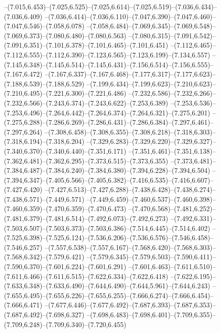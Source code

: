   --(7.015,6.453)--(7.025,6.525)--(7.025,6.614)--(7.025,6.519)--(7.036,6.434)--(7.036,6.409)%
  --(7.036,6.414)--(7.036,6.110)--(7.047,6.390)--(7.047,6.460)--(7.047,6.546)--(7.058,6.078)%
  --(7.058,6.484)--(7.069,6.345)--(7.069,6.548)--(7.069,6.373)--(7.080,6.480)--(7.080,6.563)%
  --(7.080,6.315)--(7.091,6.542)--(7.091,6.351)--(7.101,6.378)--(7.101,6.465)--(7.101,6.451)%
  --(7.112,6.465)--(7.112,6.555)--(7.112,6.390)--(7.123,6.565)--(7.123,6.199)--(7.134,6.557)%
  --(7.145,6.348)--(7.145,6.514)--(7.145,6.431)--(7.156,6.514)--(7.156,6.555)--(7.167,6.472)%
  --(7.167,6.337)--(7.167,6.468)--(7.177,6.317)--(7.177,6.623)--(7.188,6.539)--(7.188,6.529)%
  --(7.199,6.434)--(7.199,6.623)--(7.210,6.623)--(7.210,6.495)--(7.221,6.300)--(7.221,6.486)%
  --(7.232,6.586)--(7.232,6.266)--(7.232,6.566)--(7.243,6.374)--(7.243,6.622)--(7.253,6.389)%
  --(7.253,6.536)--(7.253,6.496)--(7.264,6.442)--(7.264,6.374)--(7.264,6.321)--(7.275,6.201)%
  --(7.275,6.288)--(7.286,6.269)--(7.286,6.431)--(7.286,6.384)--(7.297,6.461)--(7.297,6.264)%
  --(7.308,6.458)--(7.308,6.355)--(7.308,6.218)--(7.318,6.303)--(7.318,6.194)--(7.318,6.204)%
  --(7.329,6.283)--(7.329,6.220)--(7.329,6.327)--(7.340,6.370)--(7.340,6.440)--(7.351,6.171)%
  --(7.351,6.461)--(7.351,6.138)--(7.362,6.481)--(7.362,6.295)--(7.373,6.515)--(7.373,6.355)%
  --(7.373,6.481)--(7.384,6.487)--(7.384,6.240)--(7.384,6.380)--(7.394,6.228)--(7.394,6.504)%
  --(7.394,6.347)--(7.405,6.566)--(7.405,6.382)--(7.416,6.535)--(7.416,6.607)--(7.427,6.420)%
  --(7.427,6.513)--(7.427,6.288)--(7.438,6.428)--(7.438,6.274)--(7.438,6.571)--(7.449,6.571)%
  --(7.449,6.459)--(7.460,6.537)--(7.460,6.398)--(7.460,6.359)--(7.470,6.359)--(7.470,6.473)%
  --(7.470,6.568)--(7.481,6.252)--(7.481,6.379)--(7.481,6.514)--(7.492,6.073)--(7.492,6.273)%
  --(7.492,6.331)--(7.503,6.507)--(7.503,6.373)--(7.503,6.386)--(7.514,6.445)--(7.514,6.402)%
  --(7.525,6.398)--(7.525,6.124)--(7.536,6.206)--(7.536,6.576)--(7.546,6.458)--(7.546,6.257)%
  --(7.557,6.538)--(7.557,6.167)--(7.568,6.420)--(7.568,6.303)--(7.568,6.342)--(7.579,6.421)%
  --(7.579,6.345)--(7.579,6.503)--(7.590,6.411)--(7.590,6.370)--(7.601,6.224)--(7.601,6.291)%
  --(7.601,6.463)--(7.611,6.510)--(7.611,6.466)--(7.611,6.515)--(7.622,6.334)--(7.622,6.418)%
  --(7.622,6.195)--(7.633,6.348)--(7.633,6.490)--(7.644,6.490)--(7.644,5.961)--(7.644,6.243)%
  --(7.655,6.495)--(7.655,6.226)--(7.655,6.255)--(7.666,6.274)--(7.666,6.454)--(7.666,6.471)%
  --(7.677,6.446)--(7.677,6.492)--(7.687,6.393)--(7.687,6.353)--(7.687,6.492)--(7.698,6.327)%
  --(7.698,6.483)--(7.698,6.401)--(7.709,6.355)--(7.709,6.248)--(7.709,6.340)--(7.720,6.455)%
